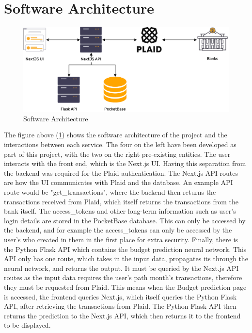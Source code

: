 \section{Software Architecture}

\begin{figure}[H]
	\centering
	\includegraphics[width=\textwidth]{images/Architecture.drawio.png}
	\caption{Software Architecture}
	\label{fig:SoftwareArchitecture}
\end{figure}

The figure above (\ref{fig:SoftwareArchitecture}) shows the software architecture of the project and the interactions between each service. The four on the left have been developed as part of this project, with the two on the right pre-existing entities. The user interacts with the front end, which is the Next.js UI. Having this separation from the backend was required for the Plaid authentication. The Next.js API routes are how the UI communicates with Plaid and the database. An example API route would be "get\_transactions", where the backend then returns the transactions received from Plaid, which itself returns the transactions from the bank itself. The access\_tokens and other long-term information such as user's login details are stored in the PocketBase database. This can only be accessed by the backend, and for example the access\_tokens can only be accessed by the user's who created in them in the first place for extra security. Finally, there is the Python Flask API which contains the budget prediction neural network. This API only has one route, which takes in the input data, propagates its through the neural network, and returns the output. It must be queried by the Next.js API routes as the input data requires the user's path month's transactions, therefore they must be requested from Plaid. This means when the Budget prediction page is accessed, the frontend queries Next.js, which itself queries the Python Flask API, after retrieving the transactions from Plaid. The Python Flask API then returns the prediction to the Next.js API, which then returns it to the frontend to be displayed.

